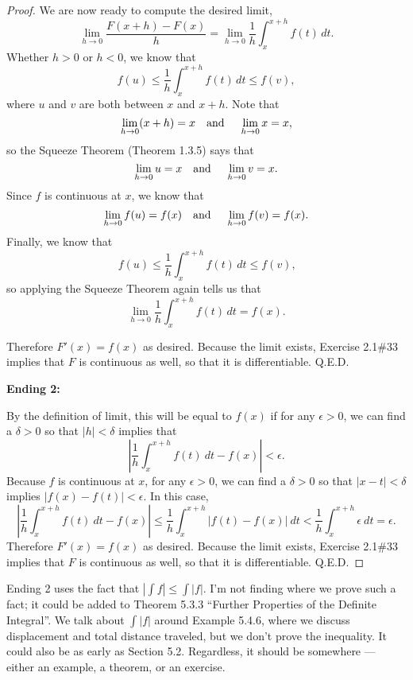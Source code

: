 \documentclass{amsart}\nofiles
\newcommand{\abs}[1]{\left\lvert#1\right\rvert}
\begin{document}
\begin{proof}
We are now ready to compute the desired limit,
\[\lim_{h\to 0}\frac{F(x+h)-F(x)}{h}=\lim_{h\to 0}\frac1h\int_x^{x+h} f(t)\,dt.\]
Whether $h>0$ or $h<0$, we know that
\[f(u)\leq \frac1h\int_x^{x+h} f(t)\,dt\leq f(v),\]
where $u$ and $v$ are both between $x$ and $x+h$. Note that 
\[\lim_{h\to 0} (x+h)=x \text{\quad and \quad} \lim_{h\to 0} x=x,\]
so the Squeeze Theorem (Theorem 1.3.5) says that
\[\lim_{h\to 0}u=x \text{\quad and \quad} \lim_{h\to 0} v=x.\]
Since $f$ is continuous at $x$, we know that
\[\lim_{h\to 0} f(u)=f(x)\text{\quad and \quad} \lim_{h\to 0}f(v)=f(x).\]
Finally, we know that
\[f(u)\leq \frac1h \int_x^{x+h} f(t)\,dt\leq f(v)\text{,}\]
so applying the Squeeze Theorem again tells us that
\[\lim_{h\to 0}\frac1h\int_x^{x+h} f(t)\,dt=f(x).\] 

Therefore $F'(x)=f(x)$ as desired.  Because the limit exists, Exercise 2.1\#33 implies that $F$ is continuous as well, so that it is differentiable. Q.E.D.

\textbf{Ending 2:}

By the definition of limit, this will be equal to $f(x)$ if for any $\epsilon>0$, we can find a $\delta>0$ so that $\abs h<\delta$ implies that
\[\abs{\frac1h\int_x^{x+h}f(t)\ dt-f(x)}<\epsilon.\]
Because $f$ is continuous at $x$, for any $\epsilon>0$, we can find a $\delta>0$ so that $\abs{x-t}<\delta$ implies $\abs{f(x)-f(t)}<\epsilon$.  In this case,
\[
 \abs{\frac1h\int_x^{x+h}f(t)\ dt-f(x)}
 \le\frac1h\int_x^{x+h}\abs{f(t)-f(x)}\ dt
 <\frac1h\int_x^{x+h}\epsilon\ dt
 =\epsilon.
\]
Therefore $F'(x)=f(x)$ as desired.  Because the limit exists, Exercise 2.1\#33 implies that $F$ is continuous as well, so that it is differentiable. Q.E.D.
\end{proof}

Ending 2 uses the fact that $\abs{\int f}\le\int\abs f$.  I'm not finding where we prove such a fact; it could be added to Theorem 5.3.3 ``Further Properties of the Definite Integral''.  We talk about $\int\abs f$ around Example 5.4.6, where we discuss displacement and total distance traveled, but we don't prove the inequality.  It could also be as early as Section 5.2.  Regardless, it should be somewhere --- either an example, a theorem, or an exercise.
\end{document}
